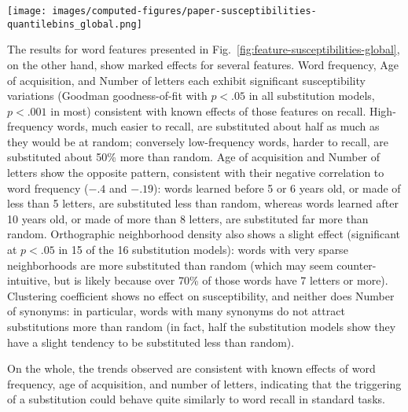 \begin{figure*}[!th]
    \centering
    \texttt{[image: images/computed-figures/paper-susceptibilities-quantilebins\_global.png]}
    \caption{\textbf{Substitution susceptibility for feature values:} susceptibility to substitution versus feature value of a candidate word for substitution , with 95\% asymptotic confidence intervals .
    }
    \label{fig:feature-susceptibilities-global}
\end{figure*}


\begin{new}

The results for word features presented in Fig.~\ref{fig:feature-susceptibilities-global}, on the other hand, show marked effects for several features.
Word frequency, Age of acquisition, and Number of letters each exhibit significant susceptibility variations (Goodman goodness-of-fit with $p < .05$ in all substitution models, $p < .001$ in most) consistent with known effects of those features on recall.
High-frequency words, much easier to recall, are substituted about half as much as they would be at random; conversely low-frequency words, harder to recall, are substituted about 50\% more than random.
Age of acquisition and Number of letters show the opposite pattern, consistent with their negative correlation to word frequency ($-.4$ and $-.19$):
words learned before 5 or 6 years old, or made of less than 5 letters, are substituted less than random, whereas words learned after 10 years old, or made of more than 8 letters, are substituted far more than random.
Orthographic neighborhood density also shows a slight effect (significant at $p < .05$ in 15 of the 16 substitution models):
words with very sparse neighborhoods are more substituted than random (which may seem counter-intuitive, but is likely because over 70\% of those words have 7 letters or more).
Clustering coefficient shows no effect on susceptibility, and neither does Number of synonyms:
in particular, words with many synonyms do not attract substitutions more than random (in fact, half the substitution models show they have a slight tendency to be substituted less than random).

On the whole, the trends observed are consistent with known effects of word frequency, age of acquisition, and number of letters, indicating that the triggering of a substitution could behave quite similarly to word recall in standard tasks.

\end{new}

